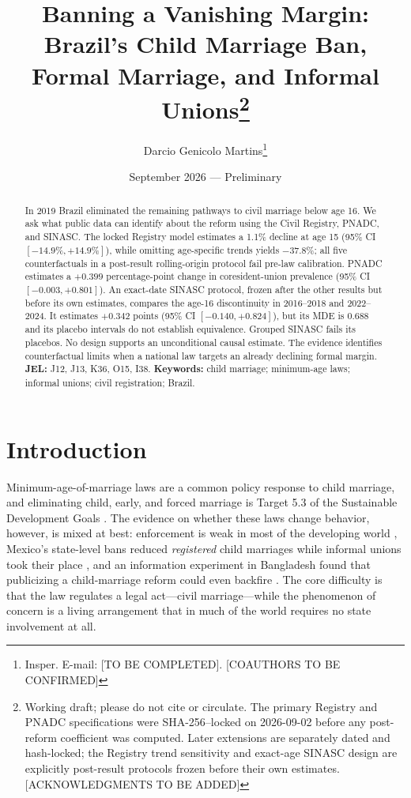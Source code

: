 \documentclass[12pt]{article}
\title{Banning a Vanishing Margin:\\ Brazil's Child Marriage Ban, Formal Marriage, and Informal Unions\thanks{%
Working draft; please do not cite or circulate. The primary Registry and PNADC
specifications were SHA-256--locked on 2026-09-02 before any post-reform coefficient
was computed. Later extensions are separately dated and hash-locked; the Registry trend
sensitivity and exact-age SINASC design are explicitly post-result protocols frozen
before their own estimates. [ACKNOWLEDGMENTS TO BE ADDED]}}
\author{Darcio Genicolo Martins\thanks{Insper. E-mail: [TO BE COMPLETED]. [COAUTHORS TO BE CONFIRMED]}}
\date{September 2026 --- Preliminary}
\begin{document}
\maketitle

\begin{abstract}
\noindent In 2019 Brazil eliminated the remaining pathways to civil marriage below age 16.
We ask what public data can identify about the reform using the Civil Registry, PNADC,
and SINASC. The locked Registry model estimates a 1.1\% decline at age 15 (95\% CI
$[-14.9\%, +14.9\%]$), while omitting age-specific trends yields $-37.8\%$; all five
counterfactuals in a post-result rolling-origin protocol fail pre-law calibration.
PNADC estimates a $+0.399$ percentage-point change in coresident-union prevalence (95\%
CI $[-0.003, +0.801]$). An exact-date SINASC protocol, frozen after the other results
but before its own estimates, compares the age-16 discontinuity in 2016--2018 and
2022--2024. It estimates $+0.342$ points (95\% CI $[-0.140, +0.824]$), but its MDE is
$0.688$ and its placebo intervals do not establish equivalence. Grouped SINASC fails
its placebos. No design supports an unconditional causal estimate. The evidence
identifies counterfactual limits when a national law targets an already declining formal
margin.\\[6pt]
\textbf{JEL:} J12, J13, K36, O15, I38.\quad
\textbf{Keywords:} child marriage; minimum-age laws; informal unions; civil registration;
Brazil.
\end{abstract}

\newpage

\section{Introduction}\label{sec:intro}

Minimum-age-of-marriage laws are a common policy response to child marriage, and
eliminating child, early, and forced marriage is Target 5.3 of the Sustainable
Development Goals \citep{UnitedNationsSDG5}. The evidence on whether these laws change
behavior, however, is mixed at best: enforcement is weak in most of the
developing world \citep{CollinTalbot2023}, Mexico's state-level bans reduced
\emph{registered} child marriages while informal unions took their place
\citep{BellesObreroLombardi2023}, and an information experiment in Bangladesh found that
publicizing a child-marriage reform could even backfire
\citep{AmirapuAsadullahWahhaj2026}. The core difficulty is that the law regulates a legal
act---civil marriage---while the phenomenon of concern is a living arrangement that in
much of the world requires no state involvement at all.
\end{document}
